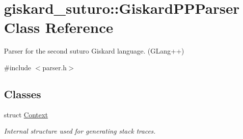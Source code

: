 \hypertarget{classgiskard__suturo_1_1GiskardPPParser}{\section{giskard\-\_\-suturo\-:\-:Giskard\-P\-P\-Parser Class Reference}
\label{classgiskard__suturo_1_1GiskardPPParser}
}


Parser for the second suturo Giskard language. (G\-Lang++)  




{\ttfamily \#include $<$parser.\-h$>$}

\subsection*{Classes}
\begin{DoxyCompactItemize}
\item 
struct \hyperlink{structgiskard__suturo_1_1GiskardPPParser_1_1Context}{Context}
\begin{DoxyCompactList}\small\item\em Internal structure used for generating stack traces. \end{DoxyCompactList}\end{DoxyCompactItemize}
